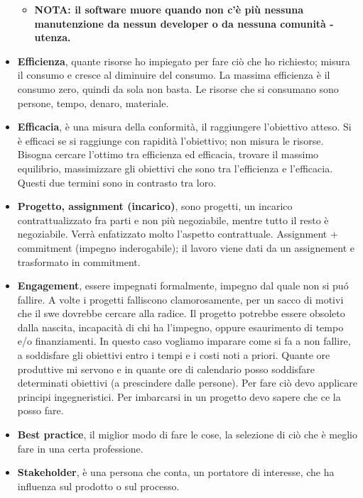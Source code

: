\documentclass[a4paper,10pt] {article}
\begin{document}
\begin{itemize}
\begin{itemize}
\item \textbf{NOTA: il software muore quando non c'è più nessuna manutenzione
da
nessun developer o da nessuna comunità - utenza.}
	\end{itemize}

\item \textbf{Efficienza}, quante risorse ho impiegato per fare ciò che ho
richiesto; misura il consumo e cresce al diminuire
del consumo. La massima efficienza è il consumo zero, quindi da sola non basta.
Le risorse che si consumano
sono persone, tempo, denaro, materiale.

\item \textbf{Efficacia}, è una misura della conformità, il raggiungere
l'obiettivo atteso. Si è efficaci se si raggiunge con
rapidità l'obiettivo; non misura le risorse. Bisogna cercare l'ottimo tra
efficienza ed efficacia, trovare il massimo equilibrio, massimizzare gli obiettivi
che sono tra l'efficienza e l'efficacia. Questi due termini sono in contrasto tra
loro.

\item\textbf{Progetto, assignment (incarico)}, sono progetti, un incarico
contrattualizzato fra parti
e non più negoziabile, mentre tutto il resto è negoziabile. Verrà
enfatizzato molto l'aspetto
contrattuale. Assignment + commitment (impegno inderogabile); il lavoro viene dati
da un assignement
e trasformato in commitment.

\item \textbf{Engagement}, essere impegnati formalmente, impegno dal quale non si
pu\'o fallire. A volte i progetti
falliscono clamorosamente, per un sacco di motivi che il swe dovrebbe cercare alla
radice. Il progetto
potrebbe essere obsoleto dalla nascita, incapacità di chi ha l'impegno, oppure
esaurimento di tempo
e/o finanziamenti.
In questo caso vogliamo imparare come si fa a non fallire, a soddisfare gli
obiettivi entro i tempi e i costi
noti a priori. Quante ore produttive mi servono e in quante ore di calendario
posso soddisfare determinati
obiettivi (a prescindere dalle persone). Per fare ciò devo applicare principi
ingegneristici. Per imbarcarsi in
un progetto devo sapere che ce la posso fare.

\item \textbf{Best practice}, il miglior modo di fare le cose, la selezione di
ciò che è meglio fare in una certa professione.

\item \textbf{Stakeholder}, è una persona che conta, un portatore di interesse,
che ha influenza sul prodotto o sul processo.


\end{itemize}
\end{document}
